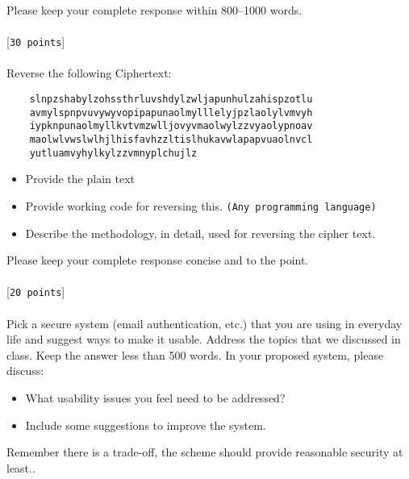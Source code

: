 \documentclass[11pt]{article}
\begin{document}
\noindent Please keep your complete response within 800--1000 words.\\\\

\newpage
{} [\texttt{30 points}] \\\\
Reverse the following Ciphertext:

\begin{verbatim}
    slnpzshabylzohssthrluvshdylzwljapunhulzahispzotlu
    avmylspnpvuvywyvopipapunaolmylllelyjpzlaolylvmvyh
    iypknpunaolmyllkvtvmzwlljovyvmaolwylzzvyaolypnoav
    maolwlvwslwlhjlhisfavhzzltislhukavwlapapvuaolnvcl
    yutluamvyhylkylzzvmnyplchujlz
\end{verbatim}

\begin{itemize}
\item Provide the plain text
\item Provide working code for reversing this. \texttt{(Any programming language)}
\item Describe the methodology, in detail, used for reversing the cipher text.

\end{itemize}

\noindent Please keep your complete response concise and to the point.\\\\

 [\texttt{20 points}] \\\\
Pick a secure system (email authentication, etc.) that you are using in everyday life and suggest ways to make it usable. Address the topics that we discussed in class. Keep the answer less than 500 words. In your proposed system, please discuss: 

\begin{itemize}
\item What usability issues you feel need to be addressed? 
\item Include some suggestions to improve the system. 

\end{itemize}

\noindent Remember there is a trade-off, the scheme should provide reasonable security at least..
\\\\\\

\end{document}
